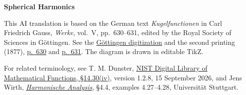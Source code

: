 \clearpage
{}
\begin{center}\textbf{Spherical Harmonics}\end{center}
\noindent This AI translation is based on the German text \textit{Kugelfunctionen} in Carl Friedrich Gauss, \textit{Werke}, vol.~V, pp.~630--631, edited by the Royal Society of Sciences in Göttingen. See the \href{https://gdz.sub.uni-goettingen.de/id/PPN236006339}{Göttingen digitization} and the second printing (1877), \href{https://archive.org/download/Werkecarlf05gausrich/page/n641}{p.~630} and \href{https://archive.org/download/Werkecarlf05gausrich/page/n642}{p.~631}. The diagram is drawn in editable TikZ.
\par\smallskip\noindent For related terminology, see T. M. Dunster, \href{https://dlmf.nist.gov/14.30.iv}{NIST Digital Library of Mathematical Functions, §14.30(iv)}, version 1.2.8, 15 September 2026, and Jens Wirth, \href{https://pnp.mathematik.uni-stuttgart.de/iadm/Wirth/Skripte/HarmonischeAnalysis/}{\textit{Harmonische Analysis}}, §4.4, examples 4.27--4.28, Universität Stuttgart.
\clearpage
